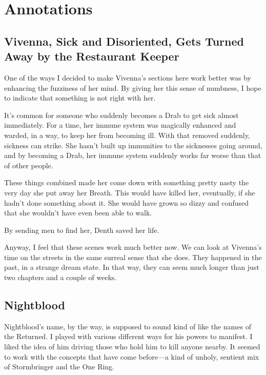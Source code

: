 \section*{Annotations}

\subsection*{Vivenna, Sick and Disoriented, Gets Turned Away by the Restaurant Keeper}

One of the ways I decided to make Vivenna’s sections here work better was by enhancing the fuzziness of her mind. By giving her this sense of numbness, I hope to indicate that something is not right with her.

It’s common for someone who suddenly becomes a Drab to get sick almost immediately. For a time, her immune system was magically enhanced and warded, in a way, to keep her from becoming ill. With that removed suddenly, sickness can strike. She hasn’t built up immunities to the sicknesses going around, and by becoming a Drab, her immune system suddenly works far worse than that of other people.

These things combined made her come down with something pretty nasty the very day she put away her Breath. This would have killed her, eventually, if she hadn’t done something about it. She would have grown so dizzy and confused that she wouldn’t have even been able to walk.

By sending men to find her, Denth saved her life.

Anyway, I feel that these scenes work much better now. We can look at Vivenna’s time on the streets in the same surreal sense that she does. They happened in the past, in a strange dream state. In that way, they can seem much longer than just two chapters and a couple of weeks.

\subsection*{Nightblood}

Nightblood’s name, by the way, is supposed to sound kind of like the names of the Returned. I played with various different ways for his powers to manifest. I liked the idea of him driving those who hold him to kill anyone nearby. It seemed to work with the concepts that have come before—a kind of unholy, sentient mix of Stormbringer and the One Ring.

